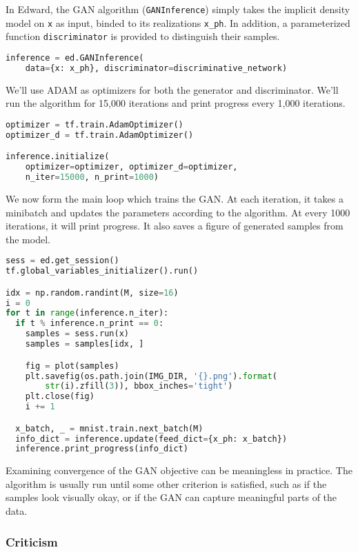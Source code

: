 In Edward, the GAN algorithm (\texttt{GANInference}) simply takes the
implicit density model on \texttt{x} as input, binded to its
realizations \texttt{x_ph}. In addition, a parameterized function
\texttt{discriminator} is provided to distinguish their
samples.

\begin{lstlisting}[language=Python]
inference = ed.GANInference(
    data={x: x_ph}, discriminator=discriminative_network)
\end{lstlisting}

We'll use ADAM as optimizers for both the generator and discriminator.
We'll run the algorithm for 15,000 iterations and print progress every
1,000 iterations.

\begin{lstlisting}[language=Python]
optimizer = tf.train.AdamOptimizer()
optimizer_d = tf.train.AdamOptimizer()

inference.initialize(
    optimizer=optimizer, optimizer_d=optimizer,
    n_iter=15000, n_print=1000)
\end{lstlisting}

We now form the main loop which trains the GAN. At each iteration, it
takes a minibatch and updates the parameters according to the
algorithm. At every 1000 iterations, it will print progress. It also
saves a figure of generated samples from the model.

\begin{lstlisting}[language=Python]
sess = ed.get_session()
tf.global_variables_initializer().run()

idx = np.random.randint(M, size=16)
i = 0
for t in range(inference.n_iter):
  if t % inference.n_print == 0:
    samples = sess.run(x)
    samples = samples[idx, ]

    fig = plot(samples)
    plt.savefig(os.path.join(IMG_DIR, '{}.png').format(
        str(i).zfill(3)), bbox_inches='tight')
    plt.close(fig)
    i += 1

  x_batch, _ = mnist.train.next_batch(M)
  info_dict = inference.update(feed_dict={x_ph: x_batch})
  inference.print_progress(info_dict)
\end{lstlisting}

Examining convergence of the GAN objective can be meaningless in
practice. The algorithm is usually run until some other criterion is
satisfied, such as if the samples look visually okay, or if the GAN
can capture meaningful parts of the data.

\subsubsection{Criticism}

